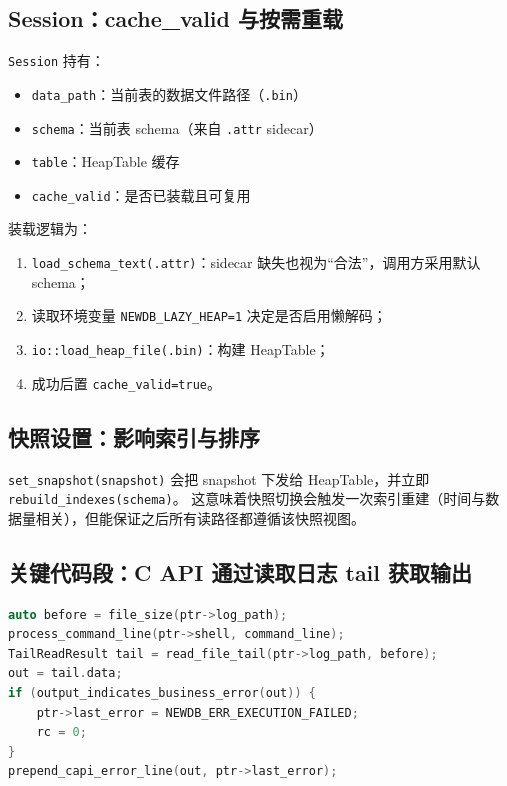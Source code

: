 \subsection{Session：cache\_valid 与按需重载}

\texttt{Session} 持有：

\begin{itemize}
  \item \texttt{data\_path}：当前表的数据文件路径（\texttt{.bin}）
  \item \texttt{schema}：当前表 schema（来自 \texttt{.attr} sidecar）
  \item \texttt{table}：HeapTable 缓存
  \item \texttt{cache\_valid}：是否已装载且可复用
\end{itemize}

装载逻辑为：

\begin{enumerate}
  \item \texttt{load\_schema\_text(.attr)}：sidecar 缺失也视为“合法”，调用方采用默认 schema；
  \item 读取环境变量 \texttt{NEWDB\_LAZY\_HEAP=1} 决定是否启用懒解码；
  \item \texttt{io::load\_heap\_file(.bin)}：构建 HeapTable；
  \item 成功后置 \texttt{cache\_valid=true}。
\end{enumerate}

\subsection{快照设置：影响索引与排序}

\texttt{set\_snapshot(snapshot)} 会把 snapshot 下发给 HeapTable，并立即 \texttt{rebuild\_indexes(schema)}。
这意味着快照切换会触发一次索引重建（时间与数据量相关），但能保证之后所有读路径都遵循该快照视图。

\subsection{关键代码段：C API 通过读取日志 tail 获取输出}

\begin{lstlisting}[language=C++,caption={newdb\_session\_execute：tail 读取与错误码（节选）}]
auto before = file_size(ptr->log_path);
process_command_line(ptr->shell, command_line);
TailReadResult tail = read_file_tail(ptr->log_path, before);
out = tail.data;
if (output_indicates_business_error(out)) {
    ptr->last_error = NEWDB_ERR_EXECUTION_FAILED;
    rc = 0;
}
prepend_capi_error_line(out, ptr->last_error);
\end{lstlisting}

